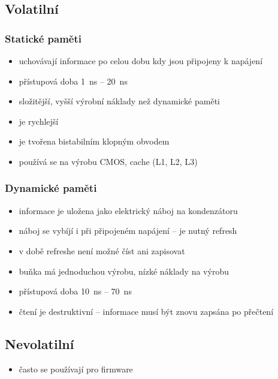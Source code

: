 \documentclass[a4paper,12pt]{article}
\providecommand{\tightlist}{%
\setlength{\itemsep}{0pt}\setlength{\parskip}{0pt}}
\begin{document}
\subsection{Volatilní}

\subsubsection{Statické paměti}

\begin{itemize}
\tightlist
\item uchovávají informace po celou dobu kdy jsou připojeny k napájení
\item přístupová doba 1~ns -- 20~ns
\item složitější, vyšší výrobní náklady než dynamické paměti
\item je rychlejší
\item je tvořena bistabilním klopným obvodem
\item používá se na výrobu CMOS, cache (L1, L2, L3)
\end{itemize}

\subsubsection{Dynamické paměti}

\begin{itemize}
\tightlist
\item informace je uložena jako elektrický náboj na kondenzátoru
\item náboj se vybíjí i při připojeném napájení -- je nutný refresh
\item v době refreshe není možné číst ani zapisovat
\item buňka má jednoduchou výrobu, nízké náklady na výrobu
\item přístupová doba 10~ns -- 70~ns
\item čtení je destruktivní -- informace musí být znovu zapsána po přečtení
\end{itemize}

\subsection{Nevolatilní}

\begin{itemize}
\tightlist
\item často se používají pro firmware
\end{itemize}
\end{document}
